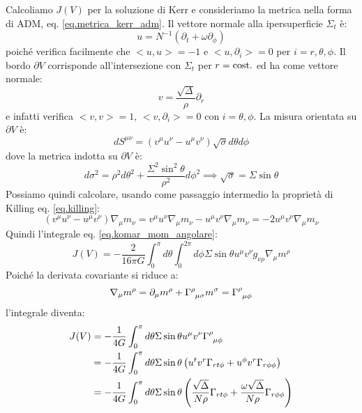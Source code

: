 Calcoliamo $J(V)$ per la soluzione di Kerr e consideriamo la metrica nella forma di ADM, eq. \ref{eq.metrica_kerr_adm}. Il vettore normale alla ipersuperficie $\Sigma_t$ è:
\begin{equation*}
    u = N^{-1}(\partial_t + \omega \partial_\phi)
\end{equation*}
poiché verifica facilmente che $<u,u> = -1$ e $<u, \partial_i> =0$ per $i=r, \theta,\phi$. Il bordo $\partial V$ corrisponde all'intersezione con $\Sigma_t$ per $r=\textrm{cost.}$ ed ha come vettore normale:
\begin{equation*}
    v = \frac{\sqrt{\Delta}}{\rho}\partial_r
\end{equation*}
e infatti verifica $<v,v> = 1$, $<v, \partial_i> = 0$ con $i= \theta,\phi$.
La misura orientata su $\partial V$ è:
\begin{equation*}
    dS^{\mu\nu} = (v^\mu u^\nu - u^\mu v^\nu)\sqrt{\sigma}d\theta d\phi
\end{equation*}
dove la metrica indotta su $\partial V$ è:
\begin{equation*}
    d\sigma^2 = \rho^2d\theta^2 + \frac{\Sigma^2 \sin^2\theta}{\rho^2}d\phi^2 \implies \sqrt{\sigma} = \Sigma \sin \theta
\end{equation*}
Possiamo quindi calcolare, usando come passaggio intermedio la proprietà di Killing eq. \ref{eq.killing}:
\begin{equation*}
    (v^\mu u^\nu - u^\mu v^\nu )\nabla_\mu m_\nu = v^\mu u^\nu \nabla_\mu m_\nu - u^\mu v^\nu \nabla_\mu m_\nu = - 2u^\mu v^\nu \nabla_\mu m_\nu
\end{equation*}
Quindi l'integrale eq. \ref{eq.komar_mom_angolare}:
\begin{equation*}
    J(V) = -\frac{2}{16\pi G}\int_0^{\pi}d\theta \int_0^{2\pi}d\phi \Sigma \sin\theta u^\mu v^\nu g_{\nu\rho}\nabla_\mu m^\rho
\end{equation*}
Poiché la derivata covariante si riduce a:
\begin{equation*}
    \nabla_\mu m^\rho = \partial_\mu m^\rho + \tensor{\Gamma}{^\rho_{\mu\sigma}}m^\sigma = \tensor{\Gamma}{^\rho_{\mu\phi}}
\end{equation*}
l'integrale diventa:
\begin{align*}
    J(V) &= - \frac{1}{4 G}\int_0^\pi d\theta \Sigma \sin \theta u^\mu v^\nu \tensor{\Gamma}{^\rho_{\mu\phi}} \\
    &= - \frac{1}{4 G}\int_0^\pi d\theta \Sigma\sin\theta \left(u^tv^r \Gamma_{rt\phi} + u^\phi v^r \Gamma_{r\phi\phi} \right) \\
    &= - \frac{1}{4G} \int_0^\pi d\theta \Sigma\sin\theta\left(\frac{\sqrt{\Delta}}{N\rho}\Gamma_{rt\phi} + \frac{\omega\sqrt{\Delta}}{N\rho}\Gamma_{r\phi\phi} \right)
\end{align*}
